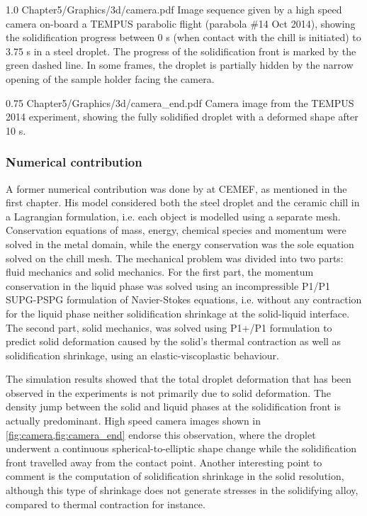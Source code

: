 \begin{figureth}
{1.0}
{Chapter5/Graphics/3d/camera.pdf}
{Image sequence given by a high speed camera on-board a TEMPUS parabolic flight (parabola \#14 Oct 2014), showing the 
solidification progress between 0 s (when contact with the chill is initiated) to 3.75 s in a  steel droplet. 
The progress of the solidification front is marked by the green dashed line. In some frames, the droplet is partially hidden by the narrow 
opening of the sample holder facing the camera.}
\label{fig:camera}
\end{figureth}

\begin{figureth}
{0.75}
{Chapter5/Graphics/3d/camera_end.pdf}
{Camera image from the TEMPUS 2014 experiment, showing the fully solidified droplet with a deformed shape after 10 s.}
\label{fig:camera_end}
\end{figureth}

\subsubsection{Numerical contribution}

A former numerical contribution was done by \citet{rivaux_simulation_2011} at CEMEF, as mentioned in the first chapter. 
His model considered both the steel droplet and the ceramic chill in a Lagrangian formulation, i.e. each object is
modelled using a separate mesh. Conservation equations of mass, energy,
chemical species and momentum were solved in the metal domain, while the energy
conservation was the sole equation solved on the chill mesh. The mechanical problem was divided
into two parts: fluid mechanics and solid mechanics. 
For the first part, the momentum conservation in the liquid phase was solved using an
incompressible P1/P1 SUPG-PSPG formulation of Navier-Stokes equations, i.e. 
without any contraction for the liquid phase neither solidification shrinkage at the solid-liquid interface.
The second part, solid mechanics, was solved using P1+/P1 formulation to predict solid deformation caused by the 
solid's thermal contraction as well as solidification shrinkage, 
using an elastic-viscoplastic behaviour. 

The simulation results showed that the total droplet deformation that has been
observed in the experiments is not primarily due to solid deformation. The density jump
between the solid and liquid phases at the solidification front is actually predominant. High
speed camera images shown in \cref{fig:camera,fig:camera_end} endorse this observation, where the droplet underwent a continuous
spherical-to-elliptic shape change while the solidification front travelled away from the
contact point. Another interesting point to comment is the computation of solidification
shrinkage in the solid resolution, although this type of shrinkage does not generate stresses 
in the solidifying alloy, compared to thermal contraction for instance.

